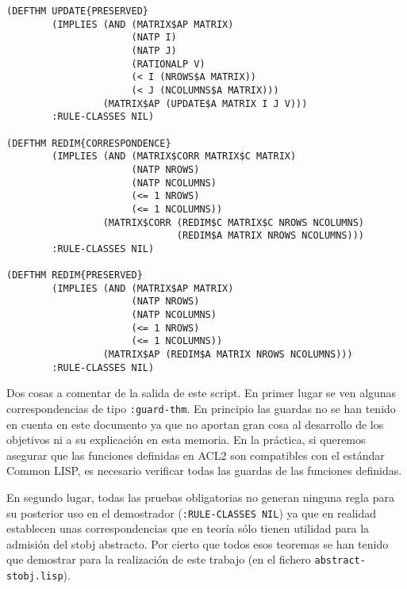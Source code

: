 \documentclass[a4paper,10pt]{article}
\begin{document}
\begin{lstlisting}[language=salidaroja]
(DEFTHM UPDATE{PRESERVED}
        (IMPLIES (AND (MATRIX$AP MATRIX)
                      (NATP I)
                      (NATP J)
                      (RATIONALP V)
                      (< I (NROWS$A MATRIX))
                      (< J (NCOLUMNS$A MATRIX)))
                 (MATRIX$AP (UPDATE$A MATRIX I J V)))
        :RULE-CLASSES NIL)

(DEFTHM REDIM{CORRESPONDENCE}
        (IMPLIES (AND (MATRIX$CORR MATRIX$C MATRIX)
                      (NATP NROWS)
                      (NATP NCOLUMNS)
                      (<= 1 NROWS)
                      (<= 1 NCOLUMNS))
                 (MATRIX$CORR (REDIM$C MATRIX$C NROWS NCOLUMNS)
                              (REDIM$A MATRIX NROWS NCOLUMNS)))
        :RULE-CLASSES NIL)

(DEFTHM REDIM{PRESERVED}
        (IMPLIES (AND (MATRIX$AP MATRIX)
                      (NATP NROWS)
                      (NATP NCOLUMNS)
                      (<= 1 NROWS)
                      (<= 1 NCOLUMNS))
                 (MATRIX$AP (REDIM$A MATRIX NROWS NCOLUMNS)))
        :RULE-CLASSES NIL)
\end{lstlisting}

\par \vspace{10pt}

Dos cosas a comentar de la salida de este script. En primer lugar se ven algunas correspondencias de tipo \texttt{:guard-thm}. En principio las guardas no se han tenido en cuenta en este documento ya que no aportan gran cosa al desarrollo de los objetivos ni a su  explicación en esta memoria. En la práctica, si queremos asegurar que las funciones definidas en ACL2 son compatibles con el estándar Common LISP, es necesario verificar todas las guardas de las funciones definidas.

\par \vspace{10pt}

En segundo lugar, todas las pruebas obligatorias no generan ninguna regla para su posterior uso en el demostrador (\texttt{:RULE-CLASSES NIL}) ya que en realidad establecen unas correspondencias que en teoría sólo tienen utilidad para la admisión del stobj abstracto. Por cierto que todos esos teoremas se han tenido que demostrar para la realización de este trabajo (en el fichero \texttt{abstract-stobj.lisp}).

\par \vspace{10pt}
\end{document}
